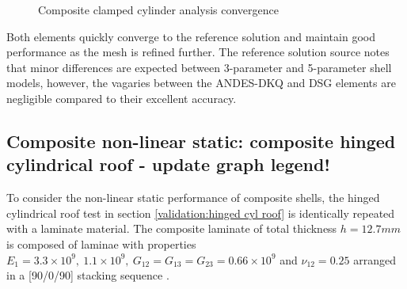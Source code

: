 \begin{figure}[H]
	\caption{\label{Composite_clamped_cylinder_test}Composite clamped cylinder analysis convergence}
\end{figure}

Both elements quickly converge to the reference solution and maintain good performance as the mesh is refined further. The reference solution source \cite{reddy2004mechanics} notes that minor differences are expected between 3-parameter and 5-parameter shell models, however, the vagaries between the ANDES-DKQ and DSG elements are negligible compared to their excellent accuracy.

\subsection{Composite non-linear static: composite hinged cylindrical roof - update graph legend!}

To consider the non-linear static performance of composite shells, the hinged cylindrical roof test in section \ref{validation:hinged cyl roof} is identically repeated with a laminate material. The composite laminate of total thickness $h = 12.7mm$ is composed of laminae with properties $E_1 = 3.3\times10^9,\ 1.1\times10^9,\ G_{12} = G_{13} = G_{23} = 0.66\times10^9$ and $\nu_{12} = 0.25$ arranged in a [90/0/90] stacking sequence \cite{Sze2004}.

